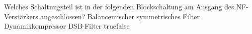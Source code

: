     {Welches Schaltungsteil ist in der folgenden Blockschaltung am Ausgang des NF-Verstärkers angeschlossen?}
    {Balancemischer}
    {symmetrisches Filter}
    {Dynamikkompressor}
    {DSB-Filter}
    {true}{false}